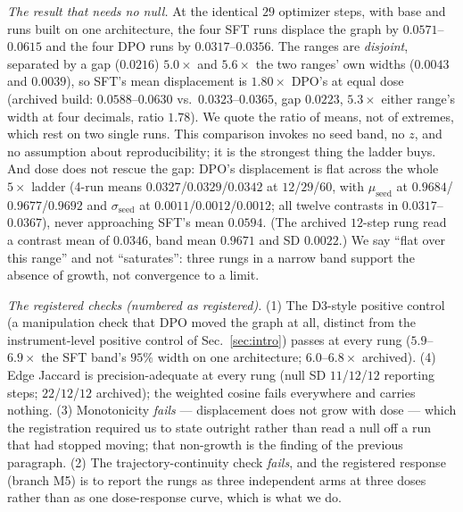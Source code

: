 \documentclass{article}
\begin{document}
\emph{The result that needs no null.} At the identical $29$ optimizer steps, with base and runs built on one architecture, the four SFT runs displace the graph by $0.0571$--$0.0615$ and the four DPO runs by $0.0317$--$0.0356$. The ranges are \emph{disjoint}, separated by a gap ($0.0216$) $5.0\times$ and $5.6\times$ the two ranges' own widths ($0.0043$ and $0.0039$), so SFT's mean displacement is $1.80\times$ DPO's at equal dose (archived build: $0.0588$--$0.0630$ vs.\ $0.0323$--$0.0365$, gap $0.0223$, $5.3\times$ either range's width at four decimals, ratio $1.78$). We quote the ratio of means, not of extremes, which rest on two single runs. This comparison invokes no seed band, no $z$, and no assumption about reproducibility; it is the strongest thing the ladder buys. And dose does not rescue the gap: DPO's displacement is flat across the whole $5\times$ ladder (4-run means $0.0327$/$0.0329$/$0.0342$ at $12$/$29$/$60$, with $\mu_{\mathrm{seed}}$ at $0.9684$/$0.9677$/$0.9692$ and $\sigma_{\mathrm{seed}}$ at $0.0011$/$0.0012$/$0.0012$; all twelve contrasts in $0.0317$--$0.0367$), never approaching SFT's mean $0.0594$. (The archived $12$-step rung read a contrast mean of $0.0346$, band mean $0.9671$ and SD $0.0022$.) We say ``flat over this range'' and not ``saturates'': three rungs in a narrow band support the absence of growth, not convergence to a limit.

\emph{The registered checks (numbered as registered).} (1) The D3-style positive control (a manipulation check that DPO moved the graph at all, distinct from the instrument-level positive control of Sec.~\ref{sec:intro}) passes at every rung ($5.9$--$6.9\times$ the SFT band's $95\%$ width on one architecture; $6.0$--$6.8\times$ archived). (4) Edge Jaccard is precision-adequate at every rung (null SD $11$/$12$/$12$ reporting steps; $22$/$12$/$12$ archived); the weighted cosine fails everywhere and carries nothing. (3) Monotonicity \emph{fails} --- displacement does not grow with dose --- which the registration required us to state outright rather than read a null off a run that had stopped moving; that non-growth is the finding of the previous paragraph. (2) The trajectory-continuity check \emph{fails}, and the registered response (branch M5) is to report the rungs as three independent arms at three doses rather than as one dose-response curve, which is what we do.
\end{document}
